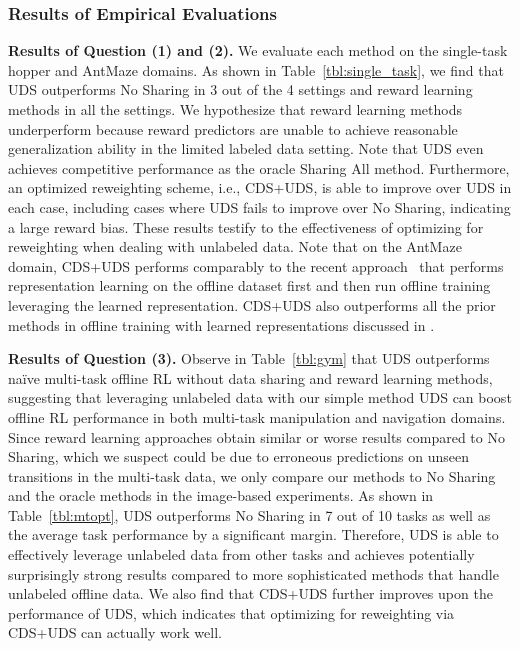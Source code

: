 \subsubsection{Results of Empirical Evaluations}
\label{sec:results}
\vspace{-0.1cm}
\noindent \textbf{Results of Question (1) and (2).} We evaluate each method on the single-task hopper and AntMaze domains. As shown in Table~\ref{tbl:single_task}, we find that UDS outperforms No Sharing in 3 out of the 4 settings and reward learning methods in all the settings. We hypothesize that reward learning methods underperform because reward predictors are unable to achieve reasonable generalization ability in the limited labeled data setting. Note that UDS even achieves competitive performance as the oracle Sharing All method. Furthermore, an optimized reweighting scheme, i.e., CDS+UDS, is able to improve over UDS in each case, including cases where UDS fails to improve over No Sharing, indicating a large reward bias. These results testify to the effectiveness of optimizing for reweighting when dealing with unlabeled data. Note that on the AntMaze domain, CDS+UDS performs comparably to the recent approach~\citep{yang2021trail} that performs representation learning on the offline dataset first and then run offline training leveraging the learned representation. CDS+UDS also outperforms all the prior methods in offline training with learned representations discussed in \cite{yang2021trail}.

\noindent \textbf{Results of Question (3).} Observe in Table~\ref{tbl:gym} that UDS outperforms na\"ive multi-task offline RL without data sharing and reward learning methods, suggesting that leveraging unlabeled data with our simple method UDS can boost offline RL performance in both multi-task manipulation and navigation domains.
Since reward learning approaches obtain similar or worse results compared to No Sharing, which we suspect could be due to erroneous predictions on unseen transitions in the multi-task data, we only compare our methods to No Sharing and the oracle methods in the image-based experiments. As shown in Table~\ref{tbl:mtopt}, UDS outperforms No Sharing in 7 out of 10 tasks as well as the average task performance by a significant margin. Therefore, UDS is able to effectively leverage unlabeled data from other tasks and achieves potentially surprisingly strong results compared to more sophisticated methods that handle unlabeled offline data. We also find that CDS+UDS further improves upon the performance of UDS, which indicates that optimizing for reweighting via CDS+UDS can actually work well.




